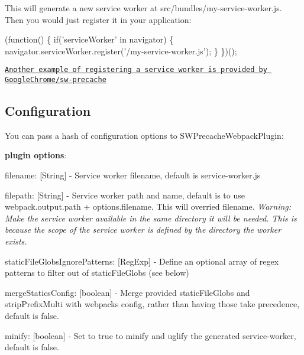 This will generate a new service worker at {\ttfamily src/bundles/my-\/service-\/worker.\+js}. Then you would just register it in your application\+:


\begin{DoxyCode}
(function() \{
  if('serviceWorker' in navigator) \{
    navigator.serviceWorker.register('/my-service-worker.js');
  \}
\})();
\end{DoxyCode}


\href{https://github.com/GoogleChrome/sw-precache/blob/5699e5d049235ef0f668e8e2aa3bf2646ba3872f/demo/app/js/service-worker-registration.js}{\tt Another example of registering a service worker is provided by Google\+Chrome/sw-\/precache}

\subsection*{Configuration}

You can pass a hash of configuration options to {\ttfamily S\+W\+Precache\+Webpack\+Plugin}\+:

{\bfseries plugin options}\+:
\begin{DoxyItemize}
\item {\ttfamily filename}\+: {\ttfamily \mbox{[}String\mbox{]}} -\/ Service worker filename, default is {\ttfamily service-\/worker.\+js}
\item {\ttfamily filepath}\+: {\ttfamily \mbox{[}String\mbox{]}} -\/ Service worker path and name, default is to use {\ttfamily webpack.\+output.\+path} + {\ttfamily options.\+filename}. This will overried {\ttfamily filename}. {\itshape Warning\+: Make the service worker available in the same directory it will be needed. This is because the scope of the service worker is defined by the directory the worker exists.}
\item {\ttfamily static\+File\+Globs\+Ignore\+Patterns}\+: {\ttfamily \mbox{[}Reg\+Exp\mbox{]}} -\/ Define an optional array of regex patterns to filter out of static\+File\+Globs (see below)
\item {\ttfamily merge\+Statics\+Config}\+: {\ttfamily \mbox{[}boolean\mbox{]}} -\/ Merge provided static\+File\+Globs and strip\+Prefix\+Multi with webpack\textquotesingle{}s config, rather than having those take precedence, default is false.
\item {\ttfamily minify}\+: {\ttfamily \mbox{[}boolean\mbox{]}} -\/ Set to true to minify and uglify the generated service-\/worker, default is false.
\end{DoxyItemize}

